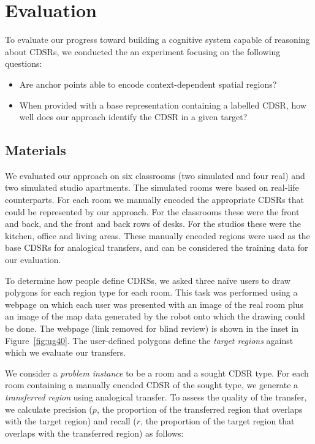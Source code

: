 \section{Evaluation}\label{sec:evaluation}

To evaluate our progress toward building a cognitive system capable of reasoning about CDSRs, we conducted the an experiment focusing on the following questions:
\begin{itemize}
\item{Are anchor points able to encode context-dependent spatial regions?}
\item{When provided with a base representation containing a labelled CDSR, how well does our approach identify the CDSR in a given target?}
\end{itemize}

\subsection{Materials}

We evaluated our approach on six classrooms (two simulated and four real) and two simulated studio apartments. The simulated rooms were based on real-life counterparts. For each room we manually encoded the appropriate CDSRs that could be represented by our approach. For the classrooms these were the front and back, and the front and back rows of desks. For the studios these were the kitchen, office and living areas. These manually encoded regions were used as the base CDSRs for analogical transfers, and can be considered the training data for our evaluation. 

To determine how people define CDRSs, we asked three na\"ive users to draw polygons for each region type for each room. This task was performed using a webpage on which each user was presented with an image of the real room plus an image of the map data generated by the robot onto which the drawing could be done. The webpage (link removed for blind review) is shown in the inset in Figure~\ref{fig:ug40}. The user-defined polygons define the \textit{target regions} against which we evaluate our transfers.

We consider a \textit{problem instance} to be a room and a sought CDSR type. For each room containing a manually encoded CDSR of the sought type, we generate a \textit{transferred region} using analogical transfer. To assess the quality of the transfer, we calculate precision ($p$, the proportion of the transferred region that overlaps with the target region) and recall ($r$, the proportion of the target region that overlaps with the transferred region) as follows:

